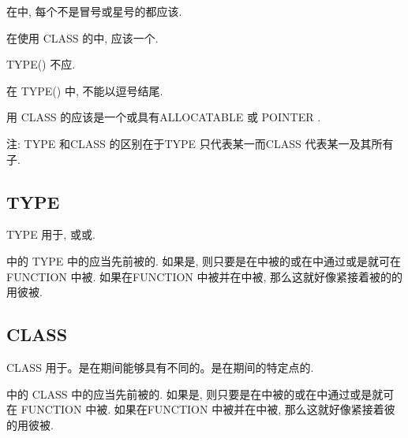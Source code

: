 在\tit{\Declaration{}\TypeSpecifier{}}中, 每个不是冒号或星号的\tit{\TypeParameter{}\Value{}}都应该\Specification{}\Expression{}.

在使用 CLASS \Keyword{}的\tit{\Declaration{}\TypeSpecifier{}}中, \tit{\Derived{}\TypeSpecifier{}}应该\Specify{}一个\ExtensibleType{}.

TYPE(\tit{\Derived{}\TypeSpecifier{}}) 不应\Specify{}\AbstractType{}.

在 TYPE(\tit{\Intrinsic{}\TypeSpecifier{}}) 中, \tit{\Intrinsic{}\TypeSpecifier{}}不能以逗号结尾.

用 CLASS \Keyword{}\Declare{}的\Entity{}应该是一个\DummyArgument{}或具有ALLOCATABLE 或 POINTER \Attribute{}.

注: TYPE \TypeSpecifier{}和CLASS \TypeSpecifier{}的区别在于TYPE \TypeSpecifier{}只代表某一\Type{}而CLASS \TypeSpecifier{}代表某一\Type{}及其所有子\Type{}.

\subsection{TYPE \TypeSpecifier{}}

TYPE \TypeSpecifier{}用于\Declare{}\AssumedType{}\Entity{}, 或\IntrinsicType{}或\DerivedType{}\Entity{}.

\Type{}\Declaration{}\Statement{}中的 TYPE \TypeSpecifier{}中的\tit{\Derived{}\TypeSpecifier{}}应当\Specify{}先前被\Define{}的\DerivedType{}. 如果\Data{}\Entity{}是\Function{}\Result{}, 则只要\DerivedType{}是在\FunctionBody{}中被\Define{}的或在\FunctionBody{}中通过\UseAssociation{}或\HostAssociation{}是\Accessible{}\DerivedType{}就可在 FUNCTION \Statement{} 中被\Specify{}. 如果\DerivedType{}在FUNCTION \Statement{}中被\Specify{}并在\FunctionBody{}中被\Define{}, 那么这就好像\Function{}\Result{}紧接着被\Specify{}的\DerivedType{}的\tit{\DerivedType{}\Definition{}}用彼\DerivedType{}被\Declare{}.

\subsection{CLASS \TypeSpecifier{}}

CLASS \TypeSpecifier{}用于\Declare{}\Polymorphic{}\Entity{}。\Polymorphic{}\Entity{}是在\Program{}\Execution{}期间能够具有不同\DynamicType{}的\Data{}\Entity{}。\DynamicType{}是\Data{}\Entity{}在\Program{}\Execution{}期间的特定点的\Type{}.

\Type{}\Declaration{}\Statement{}中的 CLASS \TypeSpecifier{}中的\tit{\Derived{}\TypeSpecifier{}}应当\Specify{}先前被\Define{}的\DerivedType{}. 如果\Data{}\Entity{}是\Function{}\Result{}, 则只要\DerivedType{}是在\FunctionBody{}中被\Define{}的或在\FunctionBody{}中通过\UseAssociation{}或\HostAssociation{}是\Accessible{}\DerivedType{}就可在 FUNCTION \Statement{} 中被\Specify{}. 如果\DerivedType{}在FUNCTION \Statement{}中被\Specify{}并在\FunctionBody{}中被\Define{}, 那么这就好像\Function{}\Result{}紧接着彼\DerivedType{}的\tit{\DerivedType{}\Definition{}}用彼\DerivedType{}被\Declare{}.

